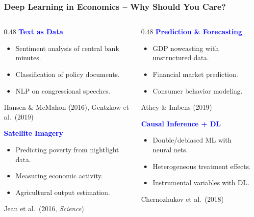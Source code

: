 \documentclass[notes,11pt, aspectratio=169]{beamer}
\begin{document}
\begin{frame}
\frametitle{Deep Learning in Economics -- Why Should You Care?}

\begin{columns}[T]
\begin{column}{0.48\textwidth}
\textcolor{blue}{\textbf{Text as Data}}
\begin{itemize}
    \item Sentiment analysis of central bank minutes.
    \item Classification of policy documents.
    \item NLP on congressional speeches.
\end{itemize}
{\tiny Hansen \& McMahon (2016), Gentzkow et al.\ (2019)}

\vspace{8pt}
\textcolor{blue}{\textbf{Satellite Imagery}}
\begin{itemize}
    \item Predicting poverty from nightlight data.
    \item Measuring economic activity.
    \item Agricultural output estimation.
\end{itemize}
{\tiny Jean et al.\ (2016, \emph{Science})}
\end{column}

\begin{column}{0.48\textwidth}
\textcolor{blue}{\textbf{Prediction \& Forecasting}}
\begin{itemize}
    \item GDP nowcasting with unstructured data.
    \item Financial market prediction.
    \item Consumer behavior modeling.
\end{itemize}
{\tiny Athey \& Imbens (2019)}

\vspace{8pt}
\textcolor{blue}{\textbf{Causal Inference + DL}}
\begin{itemize}
    \item Double/debiased ML with neural nets.
    \item Heterogeneous treatment effects.
    \item Instrumental variables with DL.
\end{itemize}
{\tiny Chernozhukov et al.\ (2018)}
\end{column}
\end{columns}
\end{frame}
\end{document}
